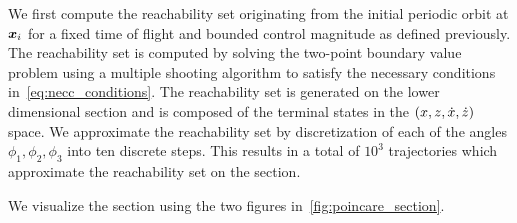 We first compute the reachability set originating from the initial periodic orbit at \( \bm{x}_i\) for a fixed time of flight and bounded control magnitude as defined previously.
The reachability set is computed by solving the two-point boundary value problem using a multiple shooting algorithm to satisfy the necessary conditions in~\cref{eq:necc_conditions}.
The reachability set is generated on the lower dimensional \Poincare section and is composed of the terminal states in the \( \left( x,z,\dot{x},\dot{z}  \right) \) space.
We approximate the reachability set by discretization of each of the angles \( \phi_1, \phi_2 , \phi_3 \) into ten discrete steps. 
This results in a total of \(10^3\) trajectories which approximate the reachability set on the \Poincare section.

We visualize the section using the two figures in~\cref{fig:poincare_section}.
